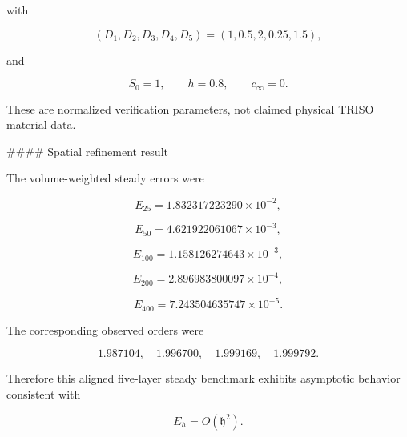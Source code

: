 \documentclass[11pt,a4paper]{article}
\begin{document}
with

\begin{equation}
(D_1,D_2,D_3,D_4,D_5)=(1,0.5,2,0.25,1.5),
\tag{TRISO-ACC-319}
\label{eq:triso-acc-319}
\end{equation}

and

\begin{equation}
S_0=1,\qquad h=0.8,\qquad c_\infty=0.
\tag{TRISO-ACC-320}
\label{eq:triso-acc-320}
\end{equation}

These are normalized verification parameters, not claimed physical TRISO material data.

\#\#\#\# Spatial refinement result

The volume-weighted steady errors were

\begin{equation}
E_{25}=1.832317223290\times10^{-2},
\tag{TRISO-ACC-321}
\label{eq:triso-acc-321}
\end{equation}

\begin{equation}
E_{50}=4.621922061067\times10^{-3},
\tag{TRISO-ACC-322}
\label{eq:triso-acc-322}
\end{equation}

\begin{equation}
E_{100}=1.158126274643\times10^{-3},
\tag{TRISO-ACC-323}
\label{eq:triso-acc-323}
\end{equation}

\begin{equation}
E_{200}=2.896983800097\times10^{-4},
\tag{TRISO-ACC-324}
\label{eq:triso-acc-324}
\end{equation}

\begin{equation}
E_{400}=7.243504635747\times10^{-5}.
\tag{TRISO-ACC-325}
\label{eq:triso-acc-325}
\end{equation}

The corresponding observed orders were

\begin{equation}
1.987104,\quad1.996700,\quad1.999169,\quad1.999792.
\tag{TRISO-ACC-326}
\label{eq:triso-acc-326}
\end{equation}

Therefore this aligned five-layer steady benchmark exhibits asymptotic behavior consistent with

\begin{equation}
\boxed{E_h=O(\mathfrak h^2).}
\tag{TRISO-ACC-327}
\label{eq:triso-acc-327}
\end{equation}
\end{document}
